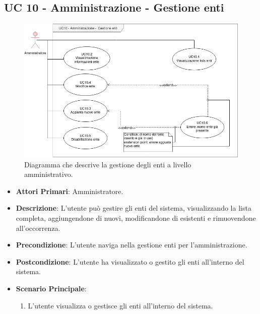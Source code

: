 \subsection{UC 10 - Amministrazione - Gestione enti}

		\begin{figure}[H]
			\centering
			\includegraphics[scale=0.60]{res/images/uc10}
			\caption{Diagramma che descrive la gestione degli enti a livello amministrativo.}
		\end{figure}

		\begin{itemize}
			\item \textbf{Attori Primari}: Amministratore.
			\item \textbf{Descrizione}: L'utente può gestire gli enti del sistema, visualizzando la lista completa, aggiungendone di nuovi, modificandone di esistenti e rimuovendone all'occorrenza.
			\item \textbf{Precondizione}: L'utente naviga nella gestione enti per l'amministrazione.
			\item \textbf{Postcondizione}: L'utente ha visualizzato o gestito gli enti all'interno del sistema. 
			\item \textbf{Scenario Principale}:
			\begin{enumerate}
				\item{L'utente visualizza o gestisce gli enti all'interno del sistema.}
			\end{enumerate}	
		\end{itemize}

